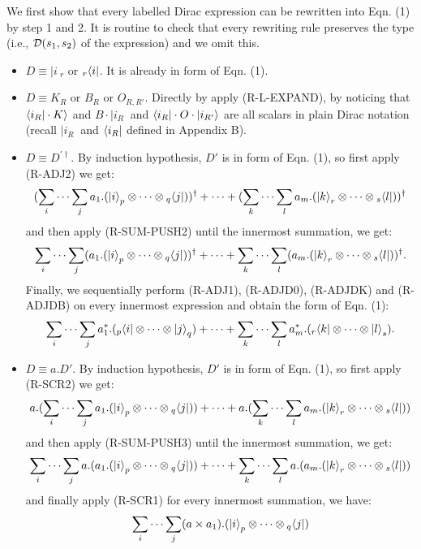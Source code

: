 We first show that every labelled Dirac expression can be rewritten into Eqn. (1) by step 1 and 2. It is routine to check that every rewriting rule preserves the type (i.e., ${\mathcal{D}}(s_1,s_2)$ of the expression) and we omit this.
\begin{itemize}
  \item $D \equiv |i\>_r$ or ${}_r\langle i|$. It is already in form of Eqn. (1).
  \item $D \equiv K_R$ or $B_R$ or $O_{R,R'}$. Directly by apply (R-L-EXPAND), by noticing that $\langle i_R|\cdot K\rangle$ and $B\cdot |i_R\>$ and $\langle i_R|\cdot O \cdot |i_{R'}\rangle$ are all scalars in plain Dirac notation (recall $|i_R\>$ and $\langle i_R|$ defined in Appendix B).
  \item $D \equiv D^{\prime\dagger}$. By induction hypothesis, $D'$ is in form of Eqn. (1), so first apply (R-ADJ2) we get:
  $$ 
  (\sum_{i}\cdots\sum_{j} a_1 . (\ket{i}_{p} \otimes \cdots \otimes {}_q\langle j|))^\dagger
  + \cdots +
  (\sum_{k}\cdots\sum_{l} a_m . (\ket{k}_{r} \otimes \cdots \otimes {}_s\langle l|))^\dagger$$
  and then apply (R-SUM-PUSH2) until the innermost summation, we get:
  $$ 
  \sum_{i}\cdots\sum_{j} (a_1 . (\ket{i}_{p} \otimes \cdots \otimes {}_q\langle j|))^\dagger
  + \cdots +
  \sum_{k}\cdots\sum_{l} (a_m . (\ket{k}_{r} \otimes \cdots \otimes {}_s\langle l|))^\dagger.$$
  Finally, we sequentially perform (R-ADJ1), (R-ADJD0), (R-ADJDK) and (R-ADJDB) on every innermost expression and obtain the form of Eqn. (1):
  $$ 
  \sum_{i}\cdots\sum_{j} a_1^* . ({}_p\langle i| \otimes \cdots \otimes \ket{j}_q)
  + \cdots +
  \sum_{k}\cdots\sum_{l} a_m^* . ({}_r\langle k| \otimes \cdots \otimes \ket{l}_s).$$
  \item $D \equiv a.D'$. By induction hypothesis, $D'$ is in form of Eqn. (1), so first apply (R-SCR2) we get:
  $$ 
  a.(\sum_{i}\cdots\sum_{j} a_1 . (\ket{i}_{p} \otimes \cdots \otimes {}_q\langle j|))
  + \cdots +
  a.(\sum_{k}\cdots\sum_{l} a_m . (\ket{k}_{r} \otimes \cdots \otimes {}_s\langle l|))$$
  and then apply (R-SUM-PUSH3) until the innermost summation, we get:
  $$ 
  \sum_{i}\cdots\sum_{j} a.(a_1 . (\ket{i}_{p} \otimes \cdots \otimes {}_q\langle j|))
  + \cdots +
  \sum_{k}\cdots\sum_{l} a.(a_m . (\ket{k}_{r} \otimes \cdots \otimes {}_s\langle l|))$$
  and finally apply (R-SCR1) for every innermost summation, we have:
  $$ 
  \sum_{i}\cdots\sum_{j} (a \times a_1) . (\ket{i}_{p} \otimes \cdots \otimes {}_q\langle j|)
$$
\end{itemize}
